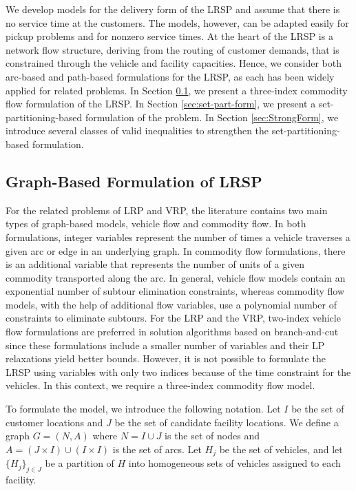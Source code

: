 \documentclass[11pt]{article}
\newcommand{\rtbpapercomment}[1]{\noindent \textcolor{red}{\bf RTB: #1 } }
\newcommand{\zelihaupdate}[1]{\noindent \textcolor{blue}{\bf ZE -- UPDATE: #1 } }
\begin{document}
We develop models for the delivery form of the LRSP and assume that there is no
service time at the customers.  The models, however, can be adapted easily for 
pickup problems and for nonzero service times.
At the heart of the LRSP is a network flow structure, deriving from the routing of customer demands,
that is constrained through the vehicle and facility capacities.  Hence, we consider both
arc-based and path-based formulations for the LRSP, as each has been widely applied
for related problems.
In Section \ref{sec:edge-based-form}, we present a three-index commodity flow 
formulation of the LRSP. In Section \ref{sec:set-part-form}, we present a 
set-partitioning-based formulation of the problem.  
In Section \ref{sec:StrongForm},
we introduce several classes of valid inequalities to strengthen the set-partitioning-based formulation.

\subsection{Graph-Based Formulation of LRSP}
\label{sec:edge-based-form}
For the related problems of LRP and VRP, the literature contains two main types of
graph-based models, vehicle flow and commodity flow. In both formulations, integer variables
represent the number of times a vehicle traverses a given arc or edge in an underlying
graph. In commodity flow formulations, there is an additional variable that represents the number of
units of a given commodity transported along the arc. In general, vehicle flow models 
contain an exponential number of subtour elimination constraints, 
whereas commodity flow models, with the help of additional flow variables, 
use a polynomial number of constraints to eliminate subtours. 
For the LRP and the VRP, two-index vehicle flow formulations are preferred 
in solution algorithms based on branch-and-cut since these formulations include 
a smaller number of variables and their LP relaxations yield better bounds. 
However, it is not possible to formulate the LRSP 
using variables with only two indices because of the time constraint for the vehicles. 
In this context, we require a three-index commodity flow model.

To formulate the model, we introduce the following notation.
Let $I$ be the set of customer locations and $J$ be the set of candidate facility locations.
We define a graph $G=(N,A)$ where $N=I \cup J$ is the set of nodes and 
$A= (J \times I) \cup (I \times I)$ is the set of arcs.   
Let $H_j$ be the set of vehicles, and let $\{H_j\}_{j \in J}$
be a partition of $H$ into  homogeneous sets of vehicles assigned to
each facility.
\end{document}
